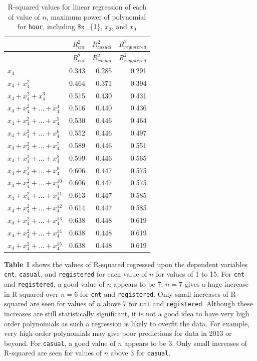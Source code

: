 \documentclass[
]{article}
\begin{document}
\begin{longtable}[]{@{}lrrr@{}}
\caption{R-squared values for linear regression of each of value of
\(n\), maximum power of polynomial for \texttt{hour}, including
\$x\_\{1\}, \(x_{2}\), and \(x_{9}\)}\tabularnewline
\toprule
& \(R^{2}_{cnt}\) & \(R^{2}_{casual}\) &
\(R^{2}_{registered}\)\tabularnewline
\midrule
\endfirsthead
\toprule
& \(R^{2}_{cnt}\) & \(R^{2}_{casual}\) &
\(R^{2}_{registered}\)\tabularnewline
\midrule
\endhead
\(x_{4}\) & 0.343 & 0.285 & 0.291\tabularnewline
\(x_{4}+x_{4}^{2}\) & 0.464 & 0.371 & 0.394\tabularnewline
\(x_{4}+x_{4}^{2}+x_{4}^{3}\) & 0.515 & 0.430 & 0.431\tabularnewline
\(x_{4}+x_{4}^{2}+\dots+x_{4}^{4}\) & 0.516 & 0.440 &
0.436\tabularnewline
\(x_{4}+x_{4}^{2}+\dots+x_{4}^{5}\) & 0.530 & 0.446 &
0.464\tabularnewline
\(x_{4}+x_{4}^{2}+\dots+x_{4}^{6}\) & 0.552 & 0.446 &
0.497\tabularnewline
\(x_{4}+x_{4}^{2}+\dots+x_{4}^{7}\) & 0.589 & 0.446 &
0.551\tabularnewline
\(x_{4}+x_{4}^{2}+\dots+x_{4}^{8}\) & 0.599 & 0.446 &
0.565\tabularnewline
\(x_{4}+x_{4}^{2}+\dots+x_{4}^{9}\) & 0.606 & 0.447 &
0.575\tabularnewline
\(x_{4}+x_{4}^{2}+\dots+x_{4}^{10}\) & 0.606 & 0.447 &
0.575\tabularnewline
\(x_{4}+x_{4}^{2}+\dots+x_{4}^{11}\) & 0.613 & 0.447 &
0.585\tabularnewline
\(x_{4}+x_{4}^{2}+\dots+x_{4}^{12}\) & 0.614 & 0.447 &
0.585\tabularnewline
\(x_{4}+x_{4}^{2}+\dots+x_{4}^{13}\) & 0.638 & 0.448 &
0.619\tabularnewline
\(x_{4}+x_{4}^{2}+\dots+x_{4}^{14}\) & 0.638 & 0.448 &
0.619\tabularnewline
\(x_{4}+x_{4}^{2}+\dots+x_{4}^{15}\) & 0.638 & 0.448 &
0.619\tabularnewline
\bottomrule
\end{longtable}

\textbf{Table 1} shows the values of R-squared regressed upon the
dependent variables \texttt{cnt}, \texttt{casual}, and
\texttt{registered} for each value of \(n\) for values of 1 to 15. For
\texttt{cnt} and \texttt{registered}, a good value of \(n\) appears to
be 7. \(n = 7\) gives a huge increase in R-squared over \(n = 6\) for
\texttt{cnt} and \texttt{registered}. Only small increases of R-squared
are seen for values of \(n\) above 7 for \texttt{cnt} and
\texttt{registered}. Although these increases are still statistically
significant, it is not a good idea to have very high order polynomials
as such a regression is likely to overfit the data. For example, very
high order polynomials may give poor predictions for data in 2013 or
beyond. For \texttt{casual}, a good value of \(n\) appears to be 3. Only
small increases of R-squared are seen for values of \(n\) above 3 for
\texttt{casual}.
\end{document}
